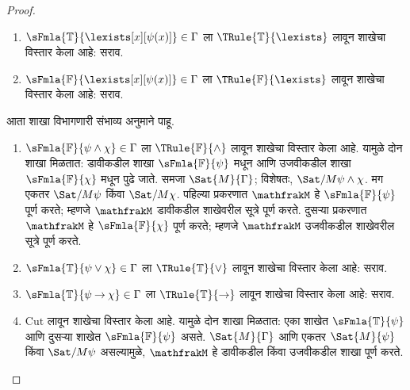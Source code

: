 \documentclass[11pt,a4paper,openany]{book}
\theoremstyle{definition}
\newcommand{\lif}{\mathbin{\to}}
\newcommand{\applytofirst}[2]{{\expandafter#1#2}}
\newcommand{\Struct}[1]{\applytofirst{\mathfrak}{#1}}
\newcommand{\True}{\ensuremath{\mathbb{T}}}
\newcommand{\False}{\ensuremath{\mathbb{F}}}
\newcommand{\Cut}{\ensuremath{\mathrm{Cut}}}
\newcommand{\readerexternalref}[1]{\textit{मूळ ग्रंथातील संबंधित विभाग}}
\begin{document}
\begin{proof}
\begin{enumerate}
  \readerexternalref{fol:syn:ass:prop:sat-quant} नुसार,
  $\Sat/{M}{\lforall[x][\varphi(x)]}$ तेव्हा आणि केवळ तेव्हाच, जेव्हा काही $s$
  साठी $\Sat/{M}{\varphi(x)}[s]$. आता $\Struct{M'}$ ही $\Struct{M}$ सारखीच
  असू द्या, फक्त $\Assign{a}{M'} = s(x)$. $a$ हे $\Gamma$ मध्ये येत
  नसल्यामुळे, \readerexternalref{fol:syn:ext:cor:extensionality-sent} नुसार कोणत्याही
  $\sFmla{\True}{\chi} \in \Gamma$ साठी $\Sat{M'}{\chi}$, आणि कोणत्याही
  $\sFmla{\False}{\chi} \in \Gamma$ साठी $\Sat/{M'}{\chi}$.

  \readerexternalref{fol:syn:ext:prop:extensionality} नुसार $\Sat/{M'}{\varphi(x)}[s]$.
  \readerexternalref{fol:syn:ext:prop:ext-formulas} नुसार $\Sat/{M'}{\varphi(a)}[s]$.
  $\varphi(a)$ हे वाक्य असल्यामुळे,
  \readerexternalref{fol:syn:ass:prop:sentence-sat-true} नुसार $\Sat/{M'}{\varphi(a)}$;
  म्हणजे $\Struct{M'}$ हे $\sFmla{\False}{\varphi(a)}$ पूर्ण करते.
\item $\sFmla{\True}{\lexists[x][\psi(x)]} \in \Gamma$ ला
  $\TRule{\True}{\lexists}$ लावून शाखेचा विस्तार केला आहे: सराव.
\item $\sFmla{\False}{\lexists[x][\psi(x)]} \in \Gamma$ ला
  $\TRule{\False}{\lexists}$ लावून शाखेचा विस्तार केला आहे: सराव.
\end{enumerate}
आता शाखा विभागणारी संभाव्य अनुमाने पाहू.
\begin{enumerate}
\item $\sFmla{\False}{\psi \land \chi} \in \Gamma$ ला
  $\TRule{\False}{\land}$ लावून शाखेचा विस्तार केला आहे. यामुळे दोन शाखा
  मिळतात: डावीकडील शाखा $\sFmla{\False}{\psi}$ मधून आणि उजवीकडील शाखा
  $\sFmla{\False}{\chi}$ मधून पुढे जाते. समजा
  $\Sat{M}{\Gamma}$; विशेषतः,
  $\Sat/{M}{\psi \land \chi}$. मग एकतर
  $\Sat/{M}{\psi}$ किंवा
  $\Sat/{M}{\chi}$. पहिल्या प्रकरणात
  $\Struct{M}$ हे
  $\sFmla{\False}{\psi}$ पूर्ण करते; म्हणजे
  $\Struct{M}$ डावीकडील शाखेवरील सूत्रे पूर्ण करते.
  दुसऱ्या प्रकरणात $\Struct{M}$ हे
  $\sFmla{\False}{\chi}$ पूर्ण करते; म्हणजे
  $\Struct{M}$ उजवीकडील शाखेवरील सूत्रे पूर्ण करते.
\item $\sFmla{\True}{\psi \lor \chi} \in \Gamma$ ला
  $\TRule{\True}{\lor}$ लावून शाखेचा विस्तार केला आहे: सराव.
\item $\sFmla{\True}{\psi \lif \chi} \in \Gamma$ ला
  $\TRule{\True}{\lif}$ लावून शाखेचा विस्तार केला आहे: सराव.
\item \Cut{} लावून शाखेचा विस्तार केला आहे. यामुळे दोन शाखा मिळतात: एका
  शाखेत $\sFmla{\True}{\psi}$ आणि दुसऱ्या शाखेत $\sFmla{\False}{\psi}$ असते.
  $\Sat{M}{\Gamma}$ आणि एकतर
  $\Sat{M}{\psi}$ किंवा
  $\Sat/{M}{\psi}$ असल्यामुळे,
  $\Struct{M}$ हे डावीकडील किंवा उजवीकडील शाखा
  पूर्ण करते.
\end{enumerate}
\end{proof}
\end{document}

